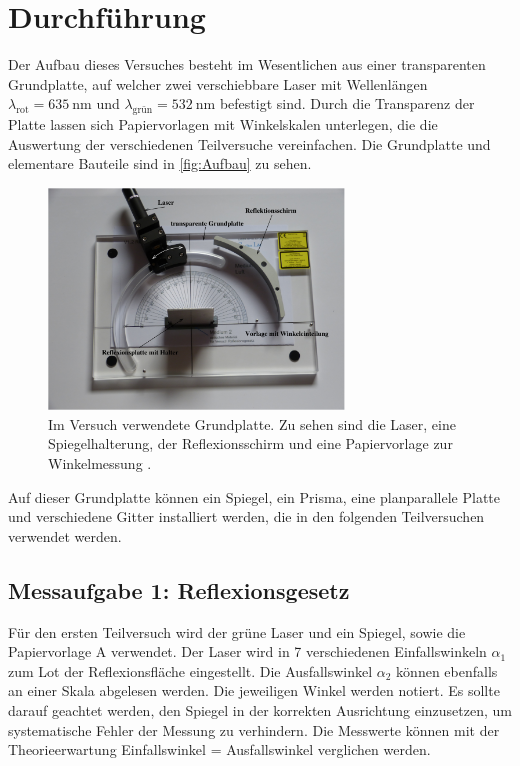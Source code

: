 \section{Durchführung}
\label{sec:Durchführung}
Der Aufbau dieses Versuches besteht im Wesentlichen aus einer transparenten Grundplatte, auf welcher zwei verschiebbare Laser mit Wellenlängen $\lambda_\text{rot} =
\qty{635}{\nano\metre}$ und $\lambda_\text{grün} = \qty{532}{\nano\metre}$ befestigt sind.
Durch die Transparenz der Platte lassen sich Papiervorlagen mit Winkelskalen unterlegen, die die Auswertung der verschiedenen Teilversuche vereinfachen.
Die Grundplatte und elementare Bauteile sind in \autoref{fig:Aufbau} zu sehen.

\begin{figure}
  \centering
  \includegraphics[width=0.7\textwidth]{content/Platte.png}
  \caption{Im Versuch verwendete Grundplatte. Zu sehen sind die Laser, eine Spiegelhalterung, der Reflexionsschirm und eine Papiervorlage zur Winkelmessung \cite{v400}.}
  \label{fig:Aufbau}
\end{figure}
  
Auf dieser Grundplatte können ein Spiegel, ein Prisma, eine planparallele Platte und verschiedene Gitter installiert werden, die in den folgenden Teilversuchen verwendet werden.

\subsection{Messaufgabe 1: Reflexionsgesetz}
\label{subsec:D_Reflexion}
Für den ersten Teilversuch wird der grüne Laser und ein Spiegel, sowie die Papiervorlage A verwendet. Der Laser wird in 7 verschiedenen Einfallswinkeln $\alpha_1$ 
zum Lot der Reflexionsfläche eingestellt. Die Ausfallswinkel $\alpha_2$ können ebenfalls an einer Skala abgelesen werden. Die jeweiligen Winkel werden notiert. 
Es sollte darauf geachtet werden, den Spiegel in der korrekten Ausrichtung
einzusetzen, um systematische Fehler der Messung zu verhindern. Die Messwerte können mit der Theorieerwartung \dq Einfallswinkel = Ausfallswinkel\dq \; verglichen werden.

